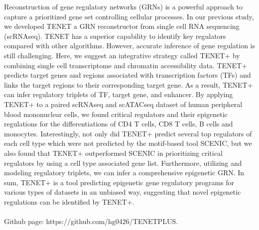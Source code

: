 \noindent
Reconstruction of gene regulatory networks (GRNs) is a powerful approach to capture a prioritized gene set controlling cellular processes. In our previous study, we developed TENET a GRN reconstructor from single cell RNA sequencing (scRNAseq). TENET has a superior capability to identify key regulators compared with other algorithms. However, accurate inference of gene regulation is still challenging. Here, we suggest an integrative strategy called TENET+ by combining single cell transcriptome and chromatin accessibility data. TENET+ predicts target genes and regions associated with transcription factors (TFs) and links the target regions to their corresponding target gene. As a result, TENET+ can infer regulatory triplets of TF, target gene, and enhancer. By applying TENET+ to a paired scRNAseq and scATACseq dataset of human peripheral blood mononuclear cells, we found critical regulators and their epigenetic regulations for the differentiations of CD4 T cells, CD8 T cells, B cells and monocytes. Interestingly, not only did TENET+ predict several top regulators of each cell type which were not predicted by the motif-based tool SCENIC, but we also found that TENET+ outperformed SCENIC in prioritizing critical regulators by using a cell type associated gene list. Furthermore, utilizing and modeling regulatory triplets, we can infer a comprehensive epigenetic GRN. In sum, TENET+ is a tool predicting epigenetic gene regulatory programs for various types of datasets in an unbiased way, suggesting that novel epigenetic regulations can be identified by TENET+.
\\
\\
\noindent
Github page: https://github.com/hg0426/TENETPLUS.
\newpage